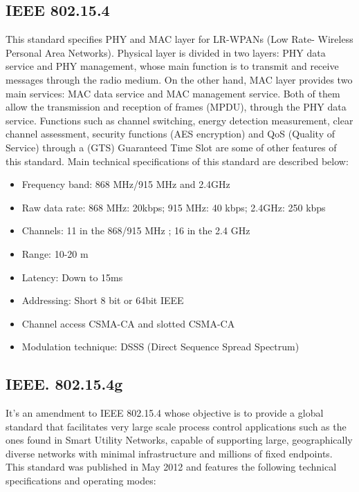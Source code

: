 \documentclass[11pt,final,onecolumn]{IEEEtran}
\begin{document}
\subsection{IEEE 802.15.4}

This standard specifies PHY and MAC layer for LR-WPANs (Low Rate- Wireless Personal Area Networks). Physical layer is divided in two layers: PHY data service and PHY management, whose main function is to transmit and receive messages through the radio medium. On the other hand, MAC layer provides two main services: MAC data service and MAC management service. Both of them allow the transmission and reception of frames (MPDU), through the PHY data service. Functions such as channel switching, energy detection measurement, clear channel assessment, security functions (AES encryption) and QoS (Quality of Service) through a (GTS) Guaranteed Time Slot are some of other features of this standard.  Main technical specifications of this standard are described below:

\begin{itemize}
	\item Frequency band: 868 MHz/915 MHz and 2.4GHz
	\item Raw data rate: 868 MHz: 20kbps; 915 MHz: 40 kbps; 2.4GHz: 250 kbps
	\item Channels: 11 in the 868/915 MHz ; 16 in the 2.4 GHz
	\item Range: 10-20 m
	\item Latency: Down to 15ms
	\item Addressing: Short  8 bit or 64bit IEEE
	\item Channel access CSMA-CA and slotted CSMA-CA
	\item Modulation technique: DSSS (Direct Sequence Spread Spectrum)
\end{itemize}

\subsection{IEEE. 802.15.4g}

It’s an amendment to IEEE 802.15.4 whose objective is to provide a global standard that facilitates very large scale process control applications such as the ones found in Smart Utility Networks, capable of supporting large, geographically diverse networks with minimal infrastructure and millions of fixed endpoints. This standard was published in May 2012 and features the following technical specifications and operating modes:
\end{document}
